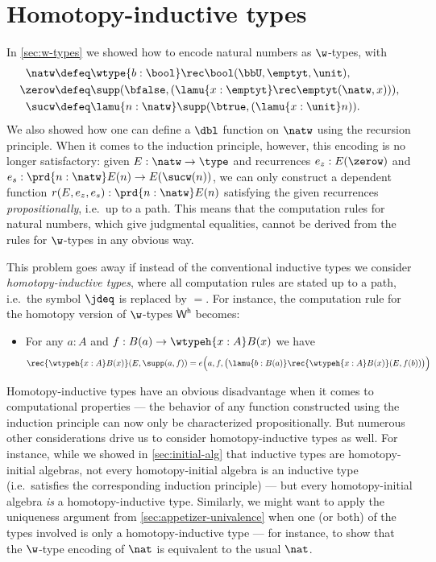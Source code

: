 \section{Homotopy-inductive types}
\label{sec:htpy-inductive}

In \autoref{sec:w-types} we showed how to encode natural numbers as $\w$-types, with
\begin{align*}
\natw & \defeq \wtype{b:\bool} \rec\bool(\bbU,\emptyt,\unit), \\
\zerow & \defeq \supp(\bfalse, (\lamu{x:\emptyt} \rec\emptyt(\natw,x))), \\
\sucw & \defeq \lamu{n:\natw} \supp(\btrue, (\lamu{x:\unit} n)).
\end{align*}
We also showed how one can define a $\dbl$ function on $\natw$ using the recursion principle.
When it comes to the induction principle, however, this encoding is no longer satisfactory: given $E : \natw \to \type$ and recurrences $e_z : E(\zerow)$ and $e_s : \prd{n : \natw}  E(n) \to E(\sucw(n))$, we can only construct a dependent function $r(E,e_z,e_s) : \prd{n : \natw} E(n)$ satisfying the given recurrences \emph{propositionally}, i.e.\ up to a path.
This means that the computation rules for natural numbers, which give judgmental equalities, cannot be derived from the rules for $\w$-types in any obvious way.

%
%
This problem goes away if instead of the conventional inductive types we consider \emph{homotopy-inductive types}, where all computation rules are stated up to a path, i.e.\ the symbol $\jdeq$ is replaced by $=$. For instance, the computation rule for the homotopy version of $\w$-types $\mathsf{W^h}$ becomes:
%
\begin{itemize}
\item For any $a : A$ and $f : B(a) \to \wtypeh{x:A} B(x)$ we have
\begin{equation*}
  \rec{\wtypeh{x:A} B(x)}(E,\supp(a,f)) = e\Big(a,f,\big(\lamu{b:B(a)} \rec{\wtypeh{x:A} B(x)}(E,f(b))\big)\Big)
\end{equation*}
\end{itemize}

Homotopy-inductive types have an obvious disadvantage when it comes to computational properties --- the behavior of any function constructed using the induction principle can now only be characterized propositionally.
But numerous other considerations drive us to consider homotopy-inductive types as well.
For instance, while we showed in \autoref{sec:initial-alg} that inductive types are homotopy-initial algebras, not every homotopy-initial algebra is an inductive type (i.e.\ satisfies the corresponding induction principle) --- but every homotopy-initial algebra \emph{is} a homotopy-inductive type.
Similarly, we might want to apply the uniqueness argument from \autoref{sec:appetizer-univalence} when one (or both) of the types involved is only a homotopy-inductive type --- for instance, to show that the $\w$-type encoding of $\nat$ is equivalent to the usual $\nat$.


